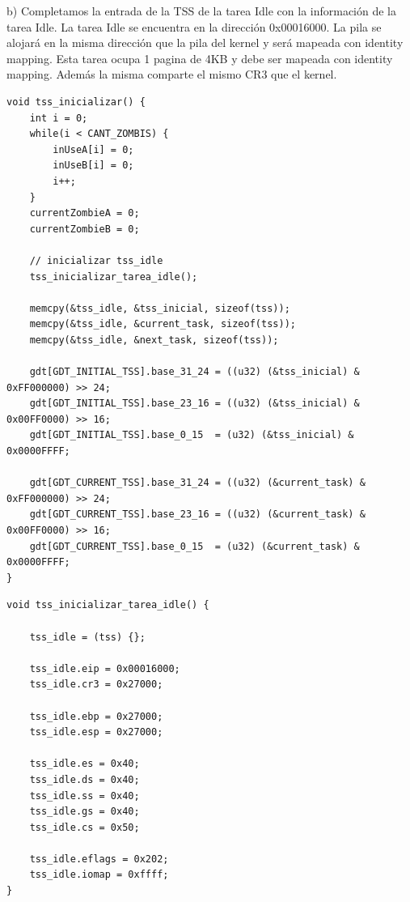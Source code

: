 \documentclass[a4paper]{article}
\begin{document}
{\large b)} Completamos la entrada de la TSS de la tarea Idle con la informaci\'on de la tarea Idle. La tarea Idle se encuentra en la direcci\'on 0x00016000. La pila se alojar\'a en la misma direcci\'on que la pila del kernel y ser\'a mapeada
con identity mapping. Esta tarea ocupa 1 pagina de 4KB y debe ser mapeada con identity mapping. Adem\'as la misma comparte el mismo CR3 que el kernel. \\

\begin{codesnippet}
\begin{verbatim}
void tss_inicializar() {
    int i = 0;
    while(i < CANT_ZOMBIS) {
        inUseA[i] = 0;
        inUseB[i] = 0;
        i++;
    }
    currentZombieA = 0;
    currentZombieB = 0;

    // inicializar tss_idle
    tss_inicializar_tarea_idle();

    memcpy(&tss_idle, &tss_inicial, sizeof(tss));
    memcpy(&tss_idle, &current_task, sizeof(tss));
    memcpy(&tss_idle, &next_task, sizeof(tss));

    gdt[GDT_INITIAL_TSS].base_31_24 = ((u32) (&tss_inicial) & 0xFF000000) >> 24;
    gdt[GDT_INITIAL_TSS].base_23_16 = ((u32) (&tss_inicial) & 0x00FF0000) >> 16;
    gdt[GDT_INITIAL_TSS].base_0_15  = (u32) (&tss_inicial) & 0x0000FFFF;

    gdt[GDT_CURRENT_TSS].base_31_24 = ((u32) (&current_task) & 0xFF000000) >> 24;
    gdt[GDT_CURRENT_TSS].base_23_16 = ((u32) (&current_task) & 0x00FF0000) >> 16;
    gdt[GDT_CURRENT_TSS].base_0_15  = (u32) (&current_task) & 0x0000FFFF;
}
\end{verbatim}
\end{codesnippet}


\begin{codesnippet}
\begin{verbatim}
void tss_inicializar_tarea_idle() {

    tss_idle = (tss) {};

    tss_idle.eip = 0x00016000;
    tss_idle.cr3 = 0x27000;
    
    tss_idle.ebp = 0x27000;
    tss_idle.esp = 0x27000;

    tss_idle.es = 0x40;
    tss_idle.ds = 0x40;
    tss_idle.ss = 0x40;
    tss_idle.gs = 0x40;
    tss_idle.cs = 0x50;

    tss_idle.eflags = 0x202;
    tss_idle.iomap = 0xffff;
}
\end{verbatim}
\end{codesnippet}
\end{document}
